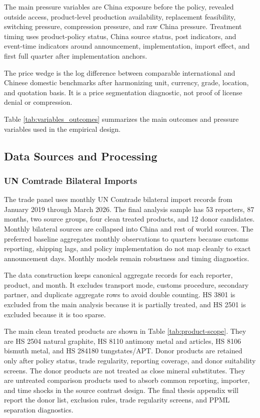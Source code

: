 \documentclass[12pt,a4paper]{article}
\numberwithin{equation}{section}
\begin{document}
The main pressure variables are China exposure before the policy, revealed outside access, product-level production availability, replacement feasibility, switching pressure, compression pressure, and raw China pressure. Treatment timing uses product-policy status, China source status, post indicators, and event-time indicators around announcement, implementation, import effect, and first full quarter after implementation anchors.

The price wedge is the log difference between comparable international and Chinese domestic benchmarks after harmonizing unit, currency, grade, location, and quotation basis. It is a price segmentation diagnostic, not proof of license denial or compression.

Table \ref{tab:variables_outcomes} summarizes the main outcomes and pressure variables used in the empirical design.



\subsection{Data Sources and Processing}

\subsubsection{UN Comtrade Bilateral Imports}

The trade panel uses monthly UN Comtrade bilateral import records from January 2019 through March 2026. The final analysis sample has 53 reporters, 87 months, two source groups, four clean treated products, and 12 donor candidates. Monthly bilateral sources are collapsed into China and rest of world sources. The preferred baseline aggregates monthly observations to quarters because customs reporting, shipping lags, and policy implementation do not map cleanly to exact announcement days. Monthly models remain robustness and timing diagnostics.

The data construction keeps canonical aggregate records for each reporter, product, and month. It excludes transport mode, customs procedure, secondary partner, and duplicate aggregate rows to avoid double counting. HS 3801 is excluded from the main analysis because it is partially treated, and HS 2501 is excluded because it is too sparse.

The main clean treated products are shown in Table \ref{tab:product-scope}. They are HS 2504 natural graphite, HS 8110 antimony metal and articles, HS 8106 bismuth metal, and HS 284180 tungstates/APT. Donor products are retained only after policy status, trade regularity, reporting coverage, and donor suitability screens. The donor products are not treated as close mineral substitutes. They are untreated comparison products used to absorb common reporting, importer, and time shocks in the source contrast design. The final thesis appendix will report the donor list, exclusion rules, trade regularity screens, and PPML separation diagnostics.
\end{document}
